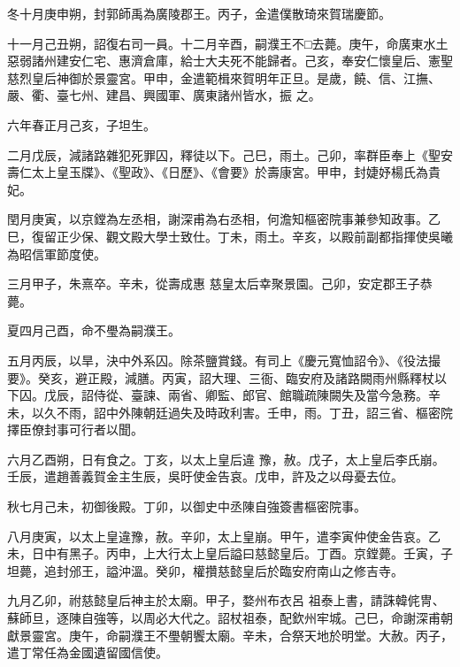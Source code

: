 \begin{pinyinscope}
 冬十月庚申朔，封郭師禹為廣陵郡王。丙子，金遣僕散琦來賀瑞慶節。



 十一月己丑朔，詔復右司一員。十二月辛酉，嗣濮王不□去薨。庚午，命廣東水土惡弱諸州建安仁宅、惠濟倉庫，給士大夫死不能歸者。己亥，奉安仁懷皇后、憲聖慈烈皇后神御於景靈宮。甲申，金遣範楫來賀明年正旦。是歲，饒、信、江撫、嚴、衢、臺七州、建昌、興國軍、廣東諸州皆水，振
 之。



 六年春正月己亥，子坦生。



 二月戊辰，減諸路雜犯死罪囚，釋徒以下。己巳，雨土。己卯，率群臣奉上《聖安壽仁太上皇玉牒》、《聖政》、《日歷》、《會要》於壽康宮。甲申，封婕妤楊氏為貴妃。



 閏月庚寅，以京鏜為左丞相，謝深甫為右丞相，何澹知樞密院事兼參知政事。乙巳，復留正少保、觀文殿大學士致仕。丁未，雨土。辛亥，以殿前副都指揮使吳曦為昭信軍節度使。



 三月甲子，朱熹卒。辛未，從壽成惠
 慈皇太后幸聚景園。己卯，安定郡王子恭薨。



 夏四月己酉，命不璺為嗣濮王。



 五月丙辰，以旱，決中外系囚。除茶鹽賞錢。有司上《慶元寬恤詔令》、《役法撮要》。癸亥，避正殿，減膳。丙寅，詔大理、三衙、臨安府及諸路闕雨州縣釋杖以下囚。戊辰，詔侍從、臺諫、兩省、卿監、郎官、館職疏陳闕失及當今急務。辛未，以久不雨，詔中外陳朝廷過失及時政利害。壬申，雨。丁丑，詔三省、樞密院擇臣僚封事可行者以聞。



 六月乙酉朔，日有食之。丁亥，以太上皇后違
 豫，赦。戊子，太上皇后李氏崩。壬辰，遣趙善義賀金主生辰，吳旴使金告哀。戊申，許及之以母憂去位。



 秋七月己未，初御後殿。丁卯，以御史中丞陳自強簽書樞密院事。



 八月庚寅，以太上皇違豫，赦。辛卯，太上皇崩。甲午，遣李寅仲使金告哀。乙未，日中有黑子。丙申，上大行太上皇后謚曰慈懿皇后。丁酉。京鏜薨。壬寅，子坦薨，追封邠王，謚沖溫。癸卯，權攢慈懿皇后於臨安府南山之修吉寺。



 九月乙卯，祔慈懿皇后神主於太廟。甲子，婺州布衣呂
 祖泰上書，請誅韓侂冑、蘇師旦，逐陳自強等，以周必大代之。詔杖祖泰，配欽州牢城。己巳，命謝深甫朝獻景靈宮。庚午，命嗣濮王不璺朝饗太廟。辛未，合祭天地於明堂。大赦。丙子，遣丁常任為金國遺留國信使。




\end{pinyinscope}
